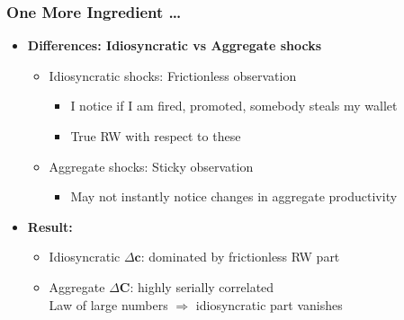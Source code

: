 \documentclass{beamer}\usepackage{dcolumn}
\newcommand{\jemph}[1]{{\color{StataDarkBlue}#1}}
\newcommand{\jbemph}[1]{\textbf{\color{SlideNavy}#1}}
\providecommand{\jemph}[1]{{\color{jirkasblue}#1}}
\begin{document}
\begin{frame}
\frametitle{One More Ingredient \dots}

\begin{itemize}
\setlength{\itemsep}{3mm}
\item  \jbemph{Differences: Idiosyncratic vs Aggregate shocks}

\begin{itemize}
\setlength{\itemsep}{2mm}
\item  \jemph{Idiosyncratic shocks:} Frictionless observation
  \begin{itemize}
  \setlength{\itemsep}{1mm}
  \item I notice if I am fired, promoted, somebody steals my wallet
  \item  True RW with respect to these
  \end{itemize}
\item \jemph{Aggregate shocks:} Sticky observation
 \begin{itemize}
   \setlength{\itemsep}{1mm}
  \item May not instantly notice changes in aggregate productivity
  \end{itemize}
\end{itemize}

\item \jbemph{Result:}
\begin{itemize}
  \setlength{\itemsep}{1mm}
\item  \jemph{Idiosyncratic $\Delta \mathbf{c}$}: dominated by frictionless RW part
\item  \jemph{Aggregate     $\Delta \mathbf{C}$}: highly serially correlated\\
  Law of large numbers $\Rightarrow$ idiosyncratic part vanishes
\end{itemize}
\end{itemize}

\end{frame}
\end{document}
